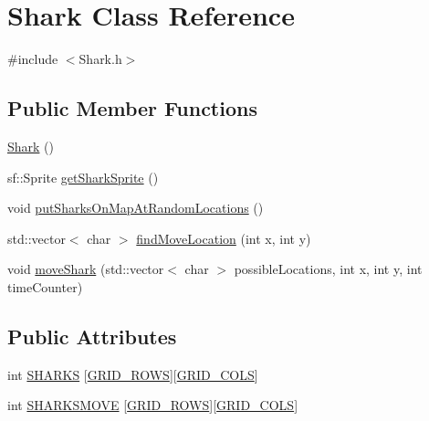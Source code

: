 \hypertarget{class_shark}{}\section{Shark Class Reference}
\label{class_shark}


{\ttfamily \#include $<$Shark.\+h$>$}

\subsection*{Public Member Functions}
\begin{DoxyCompactItemize}
\item 
\mbox{\hyperlink{class_shark_aadf418d0bebc47d351a1c5c7e427d93a}{Shark}} ()
\item 
sf\+::\+Sprite \mbox{\hyperlink{class_shark_a9b865207240b1b7620bb9b825e0cb06d}{get\+Shark\+Sprite}} ()
\item 
void \mbox{\hyperlink{class_shark_a45627e4700fc05d5a9e54283a76348f8}{put\+Sharks\+On\+Map\+At\+Random\+Locations}} ()
\item 
std\+::vector$<$ char $>$ \mbox{\hyperlink{class_shark_a4979baf6f9d2351a52fe816d597114d9}{find\+Move\+Location}} (int x, int y)
\item 
void \mbox{\hyperlink{class_shark_ae969adad351a5e31853208003e186eb4}{move\+Shark}} (std\+::vector$<$ char $>$ possible\+Locations, int x, int y, int time\+Counter)
\end{DoxyCompactItemize}
\subsection*{Public Attributes}
\begin{DoxyCompactItemize}
\item 
int \mbox{\hyperlink{class_shark_a21ce8940cbf1ded5529002c42dd01595}{S\+H\+A\+R\+KS}} \mbox{[}\mbox{\hyperlink{_config_8h_a5ba0b105774bfdc09ce545d73dcdedd3}{G\+R\+I\+D\+\_\+\+R\+O\+WS}}\mbox{]}\mbox{[}\mbox{\hyperlink{_config_8h_a881e2cda79b5951641b07f678f6ef929}{G\+R\+I\+D\+\_\+\+C\+O\+LS}}\mbox{]}
\item 
int \mbox{\hyperlink{class_shark_aa03f93cdce80f7dac4c26e4bb73d0547}{S\+H\+A\+R\+K\+S\+M\+O\+VE}} \mbox{[}\mbox{\hyperlink{_config_8h_a5ba0b105774bfdc09ce545d73dcdedd3}{G\+R\+I\+D\+\_\+\+R\+O\+WS}}\mbox{]}\mbox{[}\mbox{\hyperlink{_config_8h_a881e2cda79b5951641b07f678f6ef929}{G\+R\+I\+D\+\_\+\+C\+O\+LS}}\mbox{]}
\end{DoxyCompactItemize}


